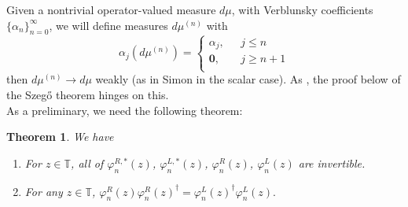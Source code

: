 \documentclass[11pt]{article}
\newtheorem{theorem}{Theorem}[section]
\begin{document}
\noindent Given a nontrivial operator-valued measure $d\mu$, with Verblunsky coefficients $\{\alpha_{n}\}_{n=0}^{\infty}$, we will define measures $d\mu^{(n)}$ with
\[
\alpha_{j}(d\mu^{(n)})= \left\{ 
	\begin{array}{ll}
        \alpha_{j},& \mbox{ $j\leq n$}  \\
        \mathbf{0},  & \mbox{ $j\geq n+1$}\\
    \end{array}
    \right.
\]
\noindent then $d\mu^{(n)} \rightarrow d\mu$ weakly (as in Simon \cite{Sim2} in the scalar case). As \cite{Sim2}, the proof below of the Szeg\H{o} theorem hinges on this.\\

\noindent As a preliminary, we need the following theorem:

\begin{theorem} \label{bernstein_zeros} We have
\begin{enumerate}
\item For $z \in \mathbb{T}$, all of $\varphi_{n}^{R,*}(z)$, $\varphi_{n}^{L,*}(z)$, $\varphi_{n}^{R}(z)$, $\varphi_{n}^{L}(z)$ are invertible.
\item For any $z \in \mathbb{T}$, $\varphi_{n}^{R}(z)\varphi_{n}^{R}(z)^{\dag} = \varphi_{n}^{L}(z)^{\dag}\varphi_{n}^{L}(z).$
\end{enumerate}

\end{theorem}
\end{document}
